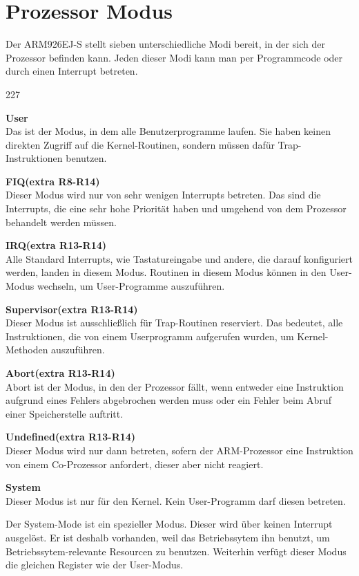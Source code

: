 \section{Prozessor Modus}
Der ARM926EJ-S stellt sieben unterschiedliche Modi bereit, in der sich der Prozessor befinden kann. Jeden dieser Modi kann man per Programmcode oder durch einen Interrupt betreten. 
\begin{dinglist}{227}
	\item{\textbf{User} \\ Das ist der Modus, in dem alle Benutzerprogramme laufen. Sie haben keinen direkten Zugriff auf die Kernel-Routinen, sondern m\"ussen daf\"ur Trap-Instruktionen benutzen.}
	\item{\textbf{FIQ(extra R8-R14) }\\ Dieser Modus wird nur von sehr wenigen Interrupts betreten. Das sind die Interrupts, die eine sehr hohe Priorit\"at haben und umgehend von dem Prozessor behandelt werden m\"ussen.}
	\item{\textbf{IRQ(extra R13-R14)}\\ Alle Standard Interrupts, wie Tastatureingabe und andere, die darauf konfiguriert werden, landen in diesem Modus. Routinen in diesem Modus k\"onnen in den User-Modus wechseln, um User-Programme auszuf\"uhren.}
	\item{\textbf{Supervisor(extra R13-R14)} \\ Dieser Modus ist ausschlie\ss lich f\"ur Trap-Routinen reserviert. Das bedeutet, alle Instruktionen, die von einem Userprogramm aufgerufen wurden, um Kernel-Methoden auszuf\"uhren.}
	\item{\textbf{Abort(extra R13-R14)}\\ Abort ist der Modus, in den der Prozessor f\"allt, wenn entweder eine Instruktion aufgrund eines Fehlers abgebrochen werden muss oder ein Fehler beim Abruf einer Speicherstelle auftritt.}
	\item{\textbf{Undefined(extra R13-R14)}\\ Dieser Modus wird nur dann betreten, sofern der ARM-Prozessor eine Instruktion von einem Co-Prozessor anfordert, dieser aber nicht reagiert.}
	\item{\textbf{System} \\ Dieser Modus ist nur f\"ur den Kernel. Kein User-Programm darf diesen betreten.}
\end{dinglist}
Der System-Mode ist ein spezieller Modus. Dieser wird \"uber keinen Interrupt ausgel\"ost. Er ist deshalb vorhanden, weil das Betriebssytem ihn benutzt, um Betriebssytem-relevante Resourcen zu benutzen. Weiterhin verf\"ugt dieser Modus die gleichen Register wie der User-Modus.

